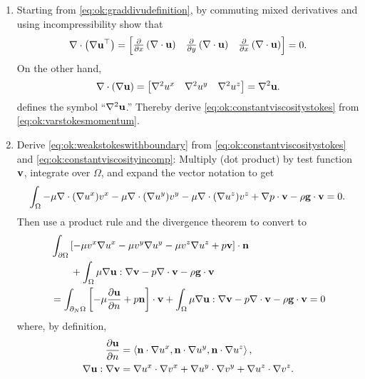 \renewcommand{\labelenumi}{\arabic{chapter}.\arabic{enumi}\quad}
\begin{enumerate}

\item \label{exer:ok:constantviscositystokes}  Starting from \eqref{eq:ok:graddivudefinition}, by commuting mixed derivatives and using incompressibility show that
\begin{equation*}
\nabla\cdot \left(\nabla \mathbf{u}^{\top}\right) = \begin{bmatrix}
    \frac{\partial}{\partial x}\left(\nabla\cdot \mathbf{u}\right) & \frac{\partial}{\partial y }\left(\nabla\cdot \mathbf{u}\right) & \frac{\partial}{\partial x} \left(\nabla\cdot \mathbf{u}\right)
    \end{bmatrix}
    = 0.
\end{equation*}
On the other hand,
\begin{equation*}
\nabla\cdot \left(\nabla \mathbf{u}\right) = \begin{bmatrix} \nabla^2 u^x & \nabla^2 u^y & \nabla^2 u^z \end{bmatrix} = \nabla^2 \mathbf{u}.
\end{equation*}
defines the symbol ``$\nabla^2 \mathbf{u}$.''  Thereby derive \eqref{eq:ok:constantviscositystokes} from \eqref{eq:ok:varstokesmomentum}.

\item \label{exer:ok:weakderive} Derive \eqref{eq:ok:weakstokeswithboundary} from \eqref{eq:ok:constantviscositystokes} and \eqref{eq:ok:constantviscosityincomp}:  Multiply (dot product) by test function $\mathbf{v}$, integrate over $\Omega$, and expand the vector notation to get
    $$\int_\Omega - \mu \nabla\cdot (\nabla u^x) v^x - \mu \nabla\cdot (\nabla u^y) v^y - \mu \nabla\cdot (\nabla u^z) v^z + \nabla p \cdot \mathbf{v} - \rho \mathbf{g} \cdot \mathbf{v} = 0.$$
Then use a product rule and the divergence theorem to convert to
\begin{align*}
   &\int_{\partial \Omega} \left[- \mu v^x \nabla u^x - \mu v^y \nabla u^y - \mu v^z \nabla u^z + p \mathbf{v}\right] \cdot \mathbf{n} \\
   &\qquad  + \int_\Omega \mu \nabla \mathbf{u} : \nabla \mathbf{v} - p \nabla\cdot \mathbf{v} - \rho \mathbf{g} \cdot \mathbf{v} \\
   &= \int_{\partial_N \Omega} \left[- \mu \frac{\partial \mathbf{u}}{\partial n} + p \mathbf{n} \right] \cdot \mathbf{v} + \int_\Omega \mu \nabla \mathbf{u} : \nabla \mathbf{v} - p \nabla\cdot \mathbf{v} - \rho \mathbf{g} \cdot \mathbf{v} = 0
\end{align*}
where, by definition,
\begin{align*}
\frac{\partial \mathbf{u}}{\partial n} &= \left<\mathbf{n}\cdot \nabla u^x,\mathbf{n}\cdot \nabla u^y,\mathbf{n}\cdot \nabla u^z\right>, \\
\nabla \mathbf{u} : \nabla \mathbf{v} &= \nabla u^x \cdot \nabla v^x + \nabla u^y \cdot \nabla v^y + \nabla u^z \cdot \nabla v^z.
\end{align*}


\end{enumerate}

